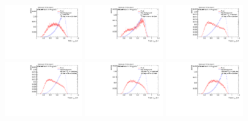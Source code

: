 \begin{figure}[H]
\includegraphics[width=0.3\textwidth]{sascha_input/Appendix/Distributions/top/distributions/beta1/h_assisted_tj_nSub32_bin6.pdf} 
\bigskip
\includegraphics[width=0.3\textwidth]{sascha_input/Appendix/Distributions/top/distributions/beta1/h_normal_tj_nSub32_bin1.pdf} \hspace{1mm}
\includegraphics[width=0.3\textwidth]{sascha_input/Appendix/Distributions/top/distributions/beta1/h_normal_tj_nSub32_bin2.pdf} \hspace{1mm}
\includegraphics[width=0.3\textwidth]{sascha_input/Appendix/Distributions/top/distributions/beta1/h_normal_tj_nSub32_bin3.pdf} 
\bigskip
\includegraphics[width=0.3\textwidth]{sascha_input/Appendix/Distributions/top/distributions/beta1/h_normal_tj_nSub32_bin4.pdf} \hspace{1mm}
\includegraphics[width=0.3\textwidth]{sascha_input/Appendix/Distributions/top/distributions/beta1/h_normal_tj_nSub32_bin5.pdf} \hspace{1mm}

\end{figure}
